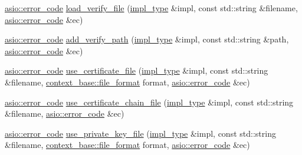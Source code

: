 \begin{DoxyCompactItemize}
\item 
\hyperlink{classasio_1_1error__code}{asio\+::error\+\_\+code} \hyperlink{classasio_1_1ssl_1_1old_1_1detail_1_1openssl__context__service_aa965117cdb97c654cb272639b3c200f8}{load\+\_\+verify\+\_\+file} (\hyperlink{classasio_1_1ssl_1_1old_1_1detail_1_1openssl__context__service_a1287914e0f48a9098c9141ca33ecd570}{impl\+\_\+type} \&impl, const std\+::string \&filename, \hyperlink{classasio_1_1error__code}{asio\+::error\+\_\+code} \&ec)
\item 
\hyperlink{classasio_1_1error__code}{asio\+::error\+\_\+code} \hyperlink{classasio_1_1ssl_1_1old_1_1detail_1_1openssl__context__service_a490895e365c0c7682f7b4b7722539c22}{add\+\_\+verify\+\_\+path} (\hyperlink{classasio_1_1ssl_1_1old_1_1detail_1_1openssl__context__service_a1287914e0f48a9098c9141ca33ecd570}{impl\+\_\+type} \&impl, const std\+::string \&path, \hyperlink{classasio_1_1error__code}{asio\+::error\+\_\+code} \&ec)
\item 
\hyperlink{classasio_1_1error__code}{asio\+::error\+\_\+code} \hyperlink{classasio_1_1ssl_1_1old_1_1detail_1_1openssl__context__service_ac225e445b4bfe41e63381bb1c380ef4c}{use\+\_\+certificate\+\_\+file} (\hyperlink{classasio_1_1ssl_1_1old_1_1detail_1_1openssl__context__service_a1287914e0f48a9098c9141ca33ecd570}{impl\+\_\+type} \&impl, const std\+::string \&filename, \hyperlink{classasio_1_1ssl_1_1context__base_acc846aa73fffcab1fecad36dcf2be1fb}{context\+\_\+base\+::file\+\_\+format} format, \hyperlink{classasio_1_1error__code}{asio\+::error\+\_\+code} \&ec)
\item 
\hyperlink{classasio_1_1error__code}{asio\+::error\+\_\+code} \hyperlink{classasio_1_1ssl_1_1old_1_1detail_1_1openssl__context__service_a7b0f2e13d6145417fea6ec8bb7fc2570}{use\+\_\+certificate\+\_\+chain\+\_\+file} (\hyperlink{classasio_1_1ssl_1_1old_1_1detail_1_1openssl__context__service_a1287914e0f48a9098c9141ca33ecd570}{impl\+\_\+type} \&impl, const std\+::string \&filename, \hyperlink{classasio_1_1error__code}{asio\+::error\+\_\+code} \&ec)
\item 
\hyperlink{classasio_1_1error__code}{asio\+::error\+\_\+code} \hyperlink{classasio_1_1ssl_1_1old_1_1detail_1_1openssl__context__service_a9f48ab7ecfb9e72c72f142f0f5b8f1e5}{use\+\_\+private\+\_\+key\+\_\+file} (\hyperlink{classasio_1_1ssl_1_1old_1_1detail_1_1openssl__context__service_a1287914e0f48a9098c9141ca33ecd570}{impl\+\_\+type} \&impl, const std\+::string \&filename, \hyperlink{classasio_1_1ssl_1_1context__base_acc846aa73fffcab1fecad36dcf2be1fb}{context\+\_\+base\+::file\+\_\+format} format, \hyperlink{classasio_1_1error__code}{asio\+::error\+\_\+code} \&ec)

\end{DoxyCompactItemize}
